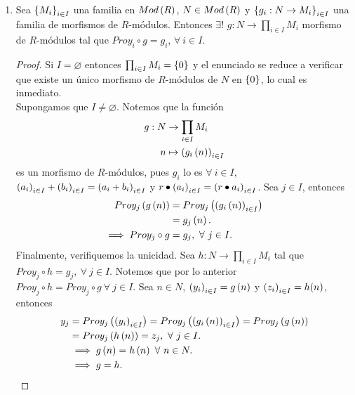 \documentclass{article}
\begin{document}
\begin{enumerate}[label=\textbf{Ej \arabic*.}]
		\item Sea ${\left\{{M}_{i}\right\}}_{i\in I}$ una familia en $Mod\left(R\right)$, $N\in Mod\left(R\right)$ y $\left\{g_i:N\to M_i\right\}_{i\in I}$ una familia de morfismos de $R$-módulos. Entonces $\exists !$ $g:N\to\prod_{i\in I}M_i$ morfismo de $R$-módulos  tal que $Proy_i\circ g=g_i$, $\forall\ i\in I$.
		\begin{proof}
			Si $I=\varnothing$ entonces $\prod_{i\in I}M_i=\left\{0\right\}$ y el enunciado se reduce a verificar que existe un único morfismo de $R$-módulos de $N$ en $\left\{0\right\}$, lo cual es inmediato.\\
		Supongamos que $I\neq\varnothing$. Notemos que la función
		\begin{align*}
			g: N &\rightarrow \prod_{i\in I}M_i\\ n &\mapsto \left(g_i\left(n\right)\right)_{i\in I}
		\end{align*}
es un morfismo de $R$-módulos, pues $g_i$ lo es $\forall\ i\in I$, ${\left({a}_{i}\right)}_{i\in I}+{\left({b}_{i}\right)}_{i\in I}=\left(a_i+b_i\right)_{i\in I}$ y $r\bullet{\left({a}_{i}\right)}_{i\in I}=\left(r\bullet a_i\right)_{i\in I}$. Sea $j\in I$, entonces
		\begin{align*}
			Proy_j\left(g\left(n\right)\right)&=Proy_j\left(\left(g_i\left(n\right)\right)_{i\in I}\right)\\
			&=g_j\left(n\right).\\
			\implies Proy_j\circ g&=g_j,\ \forall\ j\in I.
\end{align*}
Finalmente, verifiquemos la unicidad. Sea $h:N\to\prod_{i\in I}M_i$ tal que $Proy_j\circ h=g_j,\ \forall\ j\in I$. Notemos que por lo anterior $Proy_j\circ h=Proy_j\circ g\ \forall\ j\in I$. Sea $n\in N$, ${\left({y}_{i}\right)}_{i\in I}=g\left(n\right)$ y ${\left({z}_{i}\right)}_{i\in I}=h(n)$, entonces
\begin{align*}
	y_j&=Proy_j\left({\left({y}_{i}\right)}_{i\in I}\right)=Proy_j\left(\left(g_i\left(n\right)\right)_{i\in I}\right)=Proy_j\left(g\left(n\right)\right)\\
	&=Proy_j\left(h\left(n\right)\right)= z_j,\ \forall\ j\in I.\\
	&\implies g\left(n\right)=h\left(n\right)\ \forall\ n\in N.\\
	&\implies g=h.
\end{align*}
		\end{proof}
	

\end{enumerate}
\end{document}
